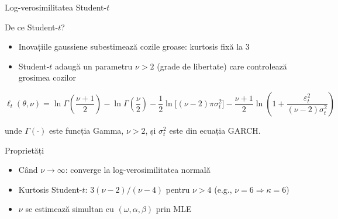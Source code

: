 \documentclass[9pt, aspectratio=169, t]{beamer}
\begin{document}
\begin{frame}{Log-verosimilitatea Student-$t$}
    \small
        \begin{block}{De ce Student-$t$?}
            \begin{itemize}
                \item Inovațiile gaussiene subestimează cozile groase: kurtosis fixă la 3
                \item Student-$t$ adaugă un parametru $\nu > 2$ (grade de libertate) care controlează grosimea cozilor
            \end{itemize}
        \end{block}
        \vspace{-1mm}
        \begin{defn}
            \vspace{-2mm}
            \[
                \ell_t(\theta, \nu) = \ln\Gamma\!\left(\frac{\nu+1}{2}\right) - \ln\Gamma\!\left(\frac{\nu}{2}\right) - \frac{1}{2}\ln\bigl[(\nu-2)\pi\sigma_t^2\bigr] - \frac{\nu+1}{2}\ln\!\left(1 + \frac{\varepsilon_t^2}{(\nu-2)\sigma_t^2}\right)
            \]
            \vspace{-2mm}

            unde $\Gamma(\cdot)$ este funcția Gamma, $\nu > 2$, și $\sigma_t^2$ este din ecuația GARCH.
        \end{defn}
        \vspace{-1mm}
        \begin{alertblock}{Proprietăți}
            \begin{itemize}
                \item Când $\nu \to \infty$: converge la log-verosimilitatea normală
                \item Kurtosis Student-$t$: $3(\nu-2)/(\nu-4)$ pentru $\nu > 4$ (e.g., $\nu = 6 \Rightarrow \kappa = 6$)
                \item $\nu$ se estimează simultan cu $(\omega, \alpha, \beta)$ prin MLE
            \end{itemize}
        \end{alertblock}
\end{frame}
\end{document}
